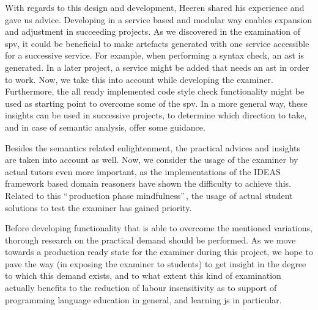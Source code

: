 With regards to this design and development, Heeren shared his experience and
gave us advice. Developing in a service based and modular way enables expansion
and adjustment in succeeding projects. As we discovered in the examination of 
\gls{spv}, it could be beneficial to make artefacts generated with one 
service accessible for a successive service. For example, when performing a
syntax check, an \gls{ast} is generated. In a later project, a service
might be added that needs an \gls{ast} in order to work. Now, we take this into
account while developing the \gls{examiner}. Furthermore, the all ready 
implemented code style check functionality might be used as starting point to
overcome some of the \gls{spv}. In a more general way, these insights can be
used in successive projects, to determine which direction to take, and in case
of semantic analysis, offer some guidance.


Besides the semantics related enlightenment, the practical advices and insights
are taken into account as well. Now, we consider the usage of the 
\gls{examiner} by actual \glspl{tutor} even more important, as the 
implementations of the IDEAS framework based domain reasoners have shown the
difficulty to achieve this. Related to this ``\,production phase mindfulness''\,, 
the usage of actual student solutions to test the \gls{examiner} has gained 
priority. 


Before developing functionality that is able to overcome the mentioned 
variations, thorough research on the practical demand should be performed. 
As we move towards a production ready state for the \gls{examiner} during
this project, we hope to pave the way (in exposing the \gls{examiner} to 
students) to get insight in the degree to which this demand exists, and to what 
extent this kind of examination actually benefits to the reduction of labour 
insensitivity as to support of programming language education in general, and 
learning \gls{js} in particular.